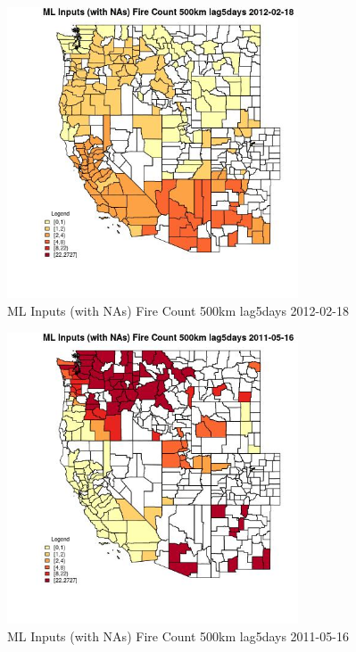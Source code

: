 \clearpage 

\begin{figure} 
\centering  
\includegraphics[width=0.77\textwidth]{Code_Outputs/Report_ML_input_PM25_Step4_part_f_de_duplicated_aveswNAs_CountyFire_Count_500km_lag5daysMean2012-02-18.jpg} 
\caption{\label{fig:Report_ML_input_PM25_Step4_part_f_de_duplicated_aveswNAsCountyFire_Count_500km_lag5daysMean2012-02-18}ML Inputs (with NAs) Fire Count 500km lag5days 2012-02-18} 
\end{figure} 
 

\begin{figure} 
\centering  
\includegraphics[width=0.77\textwidth]{Code_Outputs/Report_ML_input_PM25_Step4_part_f_de_duplicated_aveswNAs_CountyFire_Count_500km_lag5daysMean2011-05-16.jpg} 
\caption{\label{fig:Report_ML_input_PM25_Step4_part_f_de_duplicated_aveswNAsCountyFire_Count_500km_lag5daysMean2011-05-16}ML Inputs (with NAs) Fire Count 500km lag5days 2011-05-16} 
\end{figure} 
 

